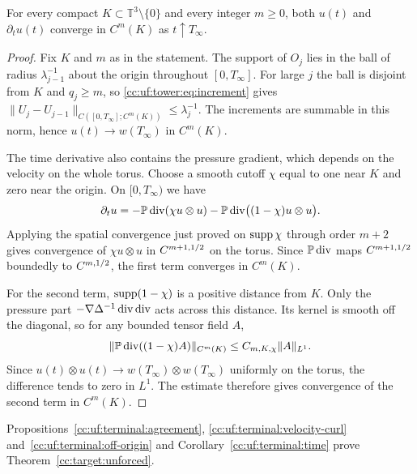 \begin{proposition}\label{cc:uf:terminal:off-origin}
For every compact $K\subset\mathbb T^3\setminus\{0\}$ and every integer
$m\ge0$, both $u(t)$ and $\partial_tu(t)$ converge in $C^m(K)$ as
$t\uparrow T_\infty$.
\end{proposition}
\begin{proof}
Fix $K$ and $m$ as in the statement. The support of $O_j$ lies in the
ball of radius $\lambda_{j-1}^{-1}$ about the origin throughout $[0,T_\infty]$.
For large $j$ the ball is disjoint from $K$ and $q_j\ge m$, so
\eqref{cc:uf:tower:eq:increment} gives
$\|U_j-U_{j-1}\|_{C([0,T_\infty];C^m(K))}\le\lambda_j^{-1}$.
The increments are summable in this norm, hence $u(t)\to w(T_\infty)$
in $C^m(K)$.

The time derivative also contains the pressure gradient, which depends
on the velocity on the whole torus. Choose a smooth cutoff $\chi$ equal
to one near $K$ and zero near the origin. On $[0,T_\infty)$ we have
\[
 \partial_tu=-\mathbb P\operatorname{div}(\chi u\otimes u)-\mathbb P\operatorname{div}\bigl((1-\chi)u\otimes u\bigr).
\]
Applying the spatial convergence just proved on $\operatorname{supp}\chi$ through
order $m+2$ gives convergence of $\chi u\otimes u$ in $C^{m+1,1/2}$
on the torus. Since $\mathbb P\operatorname{div}$ maps $C^{m+1,1/2}$ boundedly to
$C^{m,1/2}$, the first term converges in $C^m(K)$.

For the second term, $\operatorname{supp}(1-\chi)$ is a positive distance from $K$.
Only the pressure part $-\nabla\Delta^{-1}\operatorname{div}\operatorname{div}$ acts across
this distance. Its kernel is smooth off the diagonal, so for any
bounded tensor field $A$,
\[
 \|\mathbb P\operatorname{div}((1-\chi)A)\|_{C^m(K)}\le C_{m,K,\chi}\|A\|_{L^1}.
\]
Since $u(t)\otimes u(t)\to w(T_\infty)\otimes w(T_\infty)$ uniformly
on the torus, the difference tends to zero in $L^1$. The estimate
therefore gives convergence of the second term in $C^m(K)$.
\end{proof}

Propositions~\ref{cc:uf:terminal:agreement},
\ref{cc:uf:terminal:velocity-curl} and~\ref{cc:uf:terminal:off-origin}
and Corollary~\ref{cc:uf:terminal:time} prove
Theorem~\ref{cc:target:unforced}.

